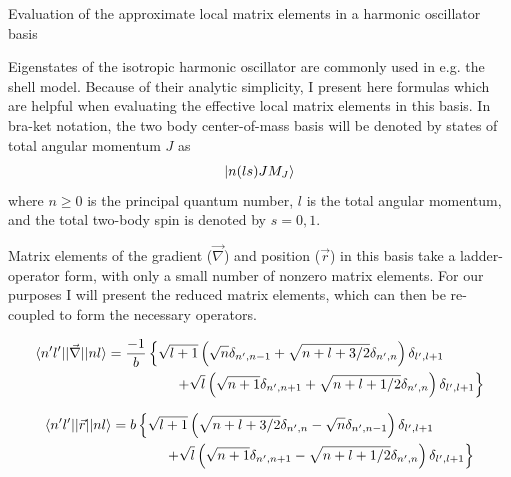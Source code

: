 \begin{section}{Evaluation of the approximate local matrix elements in a harmonic oscillator basis \label{sec:HObasis}}

Eigenstates of the isotropic harmonic oscillator are commonly used in e.g. the shell model. Because of their analytic simplicity, I present here formulas which are helpful when evaluating the effective local matrix elements in this basis. In bra-ket notation, the two body center-of-mass basis will be denoted by states of total angular momentum $J$ as
\begin{equation}
\ket{n(l s) J M_J}
\end{equation}
where $n\geq0$ is the principal quantum number, $l$ is the total angular momentum, and the total two-body spin is denoted by $s=0,1$.

Matrix elements of the gradient ($\vec{\nabla}$) and position ($\vec{r}$) in this basis take a ladder-operator form, with only a small number of nonzero matrix elements. For our purposes I will present the reduced matrix elements, which can then be re-coupled to form the necessary operators.

\begin{equation}\label{eq:gradRME}
\begin{split}
\braket{n'l' || \vec{\nabla} || nl}=\frac{-1}{b}&\left\{\sqrt{l+1}\left(\sqrt{n}\delta_{n',n-1}+\sqrt{n+l+3/2}\delta_{n',n}\right)\delta_{l',l+1}\right.\\
&\left.\quad\quad+\sqrt{l}\left(\sqrt{n+1}\delta_{n',n+1}+\sqrt{n+l+1/2}\delta_{n',n}\right)\delta_{l',l+1}\right\}
\end{split}
\end{equation}

\begin{equation}\label{eq:rRME}
\begin{split}
\braket{n'l' || \vec{r} || nl}=b&\left\{\sqrt{l+1}\left(\sqrt{n+l+3/2}\delta_{n',n}-\sqrt{n}\delta_{n',n-1}\right)\delta_{l',l+1}\right.\\
&\left.\quad\quad+\sqrt{l}\left(\sqrt{n+1}\delta_{n',n+1}-\sqrt{n+l+1/2}\delta_{n',n}\right)\delta_{l',l+1}\right\}
\end{split}
\end{equation}


\end{section}
